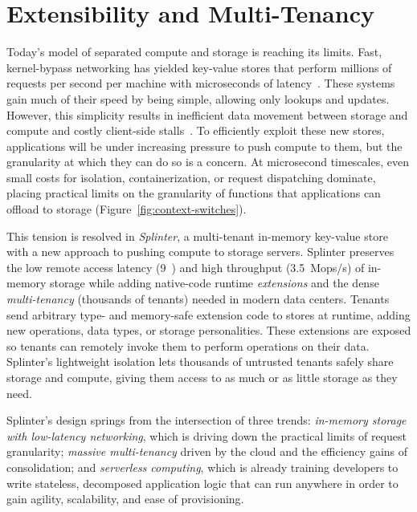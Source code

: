 \chapter{Extensibility and Multi-Tenancy}
Today's model of separated compute and storage is reaching its limits.  Fast,
  kernel-bypass networking has yielded key-value stores that perform
  millions of requests per second per machine with microseconds of
  latency~\cite{farm-2014,fasst-2016,mica,ramcloud,drtm}.
These systems gain much of their speed by being simple, allowing only lookups
  and updates.
However, this simplicity results in inefficient data movement between storage and
  compute and costly client-side stalls~\cite{killer-microseconds,grappa}.
To efficiently exploit these new stores, applications will be under
  increasing pressure to push compute to them, but the granularity at which
  they can do so is a concern.
At microsecond timescales, even small costs for isolation, containerization, or
  request dispatching dominate, placing practical limits on the granularity of
  functions that applications can offload to storage
  (Figure~\ref{fig:context-switches}).



This tension is resolved in \textsl{Splinter}, a multi-tenant in-memory key-value store with
  a new approach to pushing compute to storage servers.
Splinter preserves the low remote access latency (9~\us) and high throughput (3.5~Mops/s)
  of in-memory storage
  while adding native-code runtime \textsl{extensions} and the dense
  \textsl{multi-tenancy} (thousands of tenants) needed in modern data centers.
Tenants send arbitrary type- and memory-safe extension code to
  stores at runtime, adding new operations, data types, or
  storage personalities.
These extensions are exposed so tenants can remotely
  invoke them to perform operations on
  their data.
Splinter's lightweight isolation lets thousands of untrusted tenants
  safely share storage and compute, giving them access to as
  much or as little storage as they need.

Splinter's design springs from the intersection of three trends:
  \textsl{in-memory storage with low-latency networking}, which is driving down
  the practical limits of request granularity;
\textsl{massive multi-tenancy} driven by the cloud and the efficiency gains of
  consolidation;
and \textsl{serverless computing}, which is already training developers to
  write stateless, decomposed application logic that can run anywhere in order to gain agility,
  scalability, and ease of provisioning.

